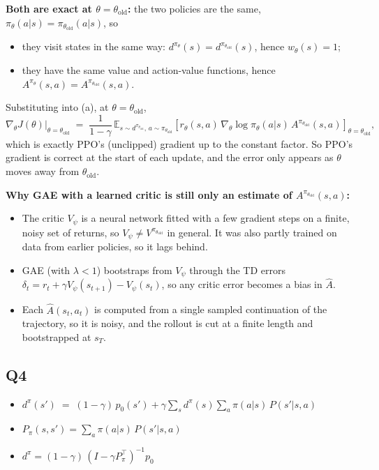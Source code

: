 \documentclass[11pt]{article}
\newcommand{\piold}{\pi_{\theta_{\mathrm{old}}}}
\newcommand{\Ahat}{\hat{A}}
\newcommand{\E}{\mathbb{E}}
\begin{document}
\begin{enumerate}[label=(\alph*)]
        \textbf{Both are exact at $\theta = \theta_{\text{old}}$:} the two policies are the same,
        $\pi_\theta(a|s) = \piold(a|s)$, so
        \begin{itemize}
          \item they visit states in the same way: $d^{\pi_\theta}(s) = d^{\piold}(s)$, hence
                $w_\theta(s) = 1$;
          \item they have the same value and action-value functions, hence
                $A^{\pi_\theta}(s,a) = A^{\piold}(s,a)$.
        \end{itemize}
        Substituting into (a), at $\theta = \theta_{\text{old}}$,
        \[
          \nabla_\theta J(\theta)\Big|_{\theta=\theta_{\text{old}}}
          \;=\;
          \frac{1}{1-\gamma}\,
          \E_{s \sim d^{\piold},\, a \sim \piold}
          \!\left[
            r_\theta(s,a)\, \nabla_\theta \log \pi_\theta(a|s)\, A^{\piold}(s,a)
            \right]_{\theta=\theta_{\text{old}}},
        \]
        which is exactly PPO's (unclipped) gradient up to the constant factor. So PPO's gradient is
        correct at the start of each update, and the error only appears as $\theta$ moves away from
        $\theta_{\text{old}}$.

        \textbf{Why GAE with a learned critic is still only an estimate of $A^{\piold}(s,a)$:}
        \begin{itemize}
          \item The critic $V_\psi$ is a neural network fitted with a few gradient steps on a finite,
                noisy set of returns, so $V_\psi \neq V^{\piold}$ in general. It was also partly trained
                on data from earlier policies, so it lags behind.
          \item GAE (with $\lambda < 1$) bootstraps from $V_\psi$ through the TD errors
                $\delta_t = r_t + \gamma V_\psi(s_{t+1}) - V_\psi(s_t)$, so any critic error
                becomes a bias in $\Ahat$.
          \item Each $\Ahat(s_t,a_t)$ is computed from a single sampled continuation of the trajectory,
                so it is noisy, and the rollout is cut at a finite length and bootstrapped at $s_T$.
        \end{itemize}
\end{enumerate}


\subsection*{Q4}
\begin{itemize}
  \item $d^{\pi}(s') \;=\; (1 - \gamma)\,p_0(s') + \gamma \sum_s d^{\pi}(s) \sum_a \pi(a|s)\,P(s'|s, a)$
  \item $P_{\pi}(s, s') = \sum_a \pi(a|s)\,P(s'|s, a)$
  \item $d^{\pi} = (1 - \gamma)\,(I - \gamma P_{\pi}^\top)^{-1}p_0$
\end{itemize}
\end{document}
